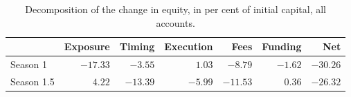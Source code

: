 \begin{table}[ht]
\centering
\small
\caption{Decomposition of the change in equity, in per cent of initial capital, all accounts.}
\label{tab:pnl}
\begin{tabular}{lrrrrrr}
\toprule
 & Exposure & Timing & Execution & Fees & Funding & Net \\
\midrule
Season 1 & $-17.33$ & $-3.55$ & $1.03$ & $-8.79$ & $-1.62$ & $-30.26$ \\
Season 1.5 & $4.22$ & $-13.39$ & $-5.99$ & $-11.53$ & $0.36$ & $-26.32$ \\
\bottomrule
\end{tabular}
\end{table}
